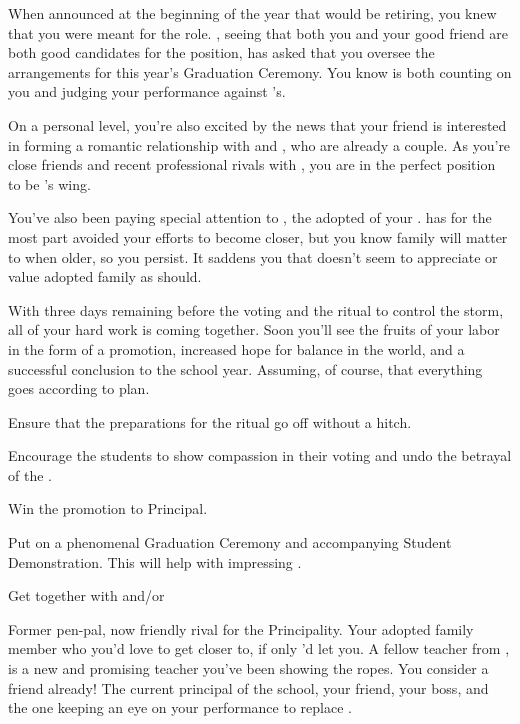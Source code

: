 \documentclass[char]{GL2020}
\begin{document}
When \cPrincipal{} announced at the beginning of the year that \cPrincipal{\they} would be retiring, you knew that you were meant for the role. \cPrincipal{}, seeing that both you and your good friend \cBeetle{} are both good candidates for the position, has asked that you oversee the arrangements for this year’s Graduation Ceremony.  You know \cPrincipal{} is both counting on you and judging your performance against \cBeetle{}’s.  

On a personal level, you’re also excited by the news that your friend \cInterpol{} is interested in forming a romantic relationship with \cBeetle{} and \cJuniorStatesman{}, who are already a couple.  As you’re close friends and recent professional rivals with \cBeetle{}, you are in the perfect position to be \cInterpol{}’s wing\cMusic{\person}.

You’ve also been paying special attention to \cAdopted{}, the adopted \cAdopted{\child} of your \cAdoptedParentOne{\nibling}. \cAdopted{} has for the most part avoided your efforts to become closer, but you know family will matter to \cAdopted{\them} when \cAdopted{\theyare} older, so you persist. It saddens you that \cAdopted{} doesn’t seem to appreciate or value \cAdopted{\their} adopted family as \cAdopted{\they} should.

With three days remaining before the voting and the ritual to control the storm, all of your hard work is coming together.  Soon you’ll see the fruits of your labor in the form of a promotion, increased hope for balance in the world, and a successful conclusion to the school year. Assuming, of course, that everything goes according to plan.

\begin{itemz}[Goals]
	\item Ensure that the preparations for the ritual go off without a hitch.
	\item Encourage the students to show compassion in their voting and undo the betrayal of the \pShip{}.
	\item Win the promotion to Principal.
\item Put on a phenomenal Graduation Ceremony and accompanying Student Demonstration. This will help with impressing \cPrincipal{}.
\item Get \cInterpol{} together with \cBeetle{} and/or \cJuniorStatesman{}
\end{itemz}

\begin{itemz}[Notes]
	\item 
\end{itemz}

\begin{contacts}
	\contact{\cBeetle{}} Former pen-pal, now friendly rival for the Principality.
	\contact{\cAdopted{}} Your adopted family member who you’d love to get closer to, if only \cAdopted{\they}’d let you.
	\contact{\cInterpol{}} A fellow teacher from \pFarm{}, \cInterpol{} is a new and promising teacher you’ve been showing the ropes.  You consider \cInterpol{\them} a friend already!
\contact{\cPrincipal{}} The current principal of the school, your friend, your boss, and the one keeping an eye on your performance to replace \cPrincipal{\them}.
\end{contacts}
\end{document}
